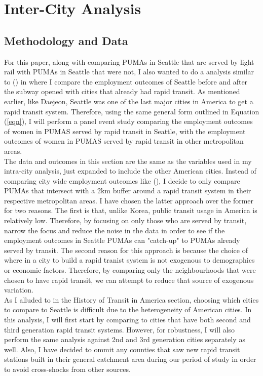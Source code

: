 \documentclass[A4paper,12pt]{article}
\begin{document}
\section{Inter-City Analysis}

\subsection{Methodology and Data}

For this paper, along with comparing PUMAs in Seattle that are served by light rail with PUMAs in Seattle that were not, I also wanted to do a analysis similar to \citeauthor{kim_subways_2019} (\citeyear{kim_subways_2019}) in where I compare the employment outcomes of Seattle before and after the subway opened with cities that already had rapid transit. As mentioned earlier, like Daejeon, Seattle was one of the last major cities in America to get a rapid transit system. Therefore, using the same general form outlined in Equation (\ref{eqn}), I will perform a panel event study comparing the employment outcomes of women in PUMAS served by rapid transit in Seattle, with the employment outcomes of women in PUMAS served by rapid transit in other metropolitan areas.  \\

The data and outcomes in this section are the same as the variables used in my intra-city analysis, just expanded to include the other American cities. Instead of comparing city wide employment outcomes like \citeauthor{kim_subways_2019} (\citeyear{kim_subways_2019}), I decide to only compare PUMAs that intersect with a 2km buffer around a rapid transit system in their respective metropolitan areas. I have chosen the latter approach over the former for two reasons. The first is that, unlike Korea, public transit usage in America is relatively low. Therefore, by focusing on only those who are served by transit, narrow the focus and reduce the noise in the data in order to see if the employment outcomes in Seattle PUMAs can "catch-up" to PUMAs already served by transit. The second reason for this approach is because the choice of where in a city to build a rapid tranist system is not exogenous to demographics or economic factors. Therefore, by comparing only the neighbourhoods that were chosen to have rapid transit, we can attempt to reduce that source of exogenous variation.\\

As I alluded to in the History of Transit in America section, choosing which cities to compare to Seattle is difficult due to the heterogeneity of American cities. In this analysis, I will first start by comparing to cities that have both second and third generation rapid transit systems. However, for robustness, I will also perform the same analysis against 2nd and 3rd generation cities separately as well. Also, I have decided to ommit any counties that saw new rapid transit stations built in their general catchment area during our period of study in order to avoid cross-shocks from other sources. \\
\end{document}
